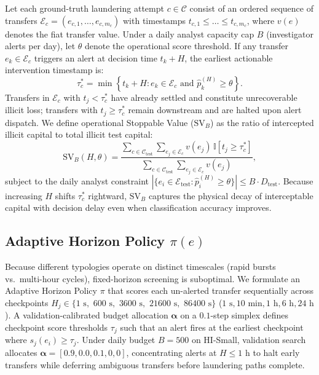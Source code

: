 \documentclass[sigconf,nonacm]{acmart}
\begin{document}
Let each ground-truth laundering attempt $c \in \mathcal{C}$ consist of an ordered sequence of transfers $\mathcal{E}_c = (e_{c,1}, \dots, e_{c,m_c})$ with timestamps $t_{c,1} \le \dots \le t_{c,m_c}$, where $v(e)$ denotes the fiat transfer value. Under a daily analyst capacity cap $B$ (investigator alerts per day), let $\theta$ denote the operational score threshold. If any transfer $e_k \in \mathcal{E}_c$ triggers an alert at decision time $t_k + H$, the earliest actionable intervention timestamp is:
\begin{equation}
\label{eq:earliest_stop}
\tau_c^* = \min \left\{ t_k + H : e_k \in \mathcal{E}_c \text{ and } \hat{p}_k^{(H)} \ge \theta \right\}.
\end{equation}
Transfers in $\mathcal{E}_c$ with $t_j < \tau_c^*$ have already settled and constitute unrecoverable illicit loss; transfers with $t_j \ge \tau_c^*$ remain downstream and are halted upon alert dispatch. We define operational Stoppable Value ($\text{SV}_B$) as the ratio of intercepted illicit capital to total illicit test capital:
\begin{equation}
\label{eq:stoppable_value}
\text{SV}_B(H, \theta) = \frac{\sum_{c \in \mathcal{C}_{\text{test}}} \sum_{e_j \in \mathcal{E}_c} v(e_j) \, \mathbb{I}\!\left[ t_j \ge \tau_c^* \right]}{\sum_{c \in \mathcal{C}_{\text{test}}} \sum_{e_j \in \mathcal{E}_c} v(e_j)},
\end{equation}
subject to the daily analyst constraint $|\{ e_i \in \mathcal{E}_{\text{test}} : \hat{p}_i^{(H)} \ge \theta \}| \le B \cdot D_{\text{test}}$. Because increasing $H$ shifts $\tau_c^*$ rightward, $\text{SV}_B$ captures the physical decay of interceptable capital with decision delay even when classification accuracy improves.

\subsection{Adaptive Horizon Policy $\pi(e)$}
Because different typologies operate on distinct timescales (rapid bursts vs.\ multi-hour cycles), fixed-horizon screening is suboptimal. We formulate an Adaptive Horizon Policy $\pi$ that scores each un-alerted transfer sequentially across checkpoints $H_j \in \{1\text{ s},$ $600\text{ s},$ $3600\text{ s},$ $21600\text{ s},$ $86400\text{ s}\}$ ($1\text{ s}, 10\text{ min}, 1\text{ h}, 6\text{ h}, 24\text{ h}$). A validation-calibrated budget allocation $\boldsymbol{\alpha}$ on a $0.1$-step simplex defines checkpoint score thresholds $\tau_j$ such that an alert fires at the earliest checkpoint where $s_j(e_i) \ge \tau_j$. Under daily budget $B=500$ on HI-Small, validation search allocates $\boldsymbol{\alpha}=[0.9, 0.0, 0.1, 0, 0]$, concentrating alerts at $H \le 1\text{ h}$ to halt early transfers while deferring ambiguous transfers before laundering paths complete.
\end{document}
